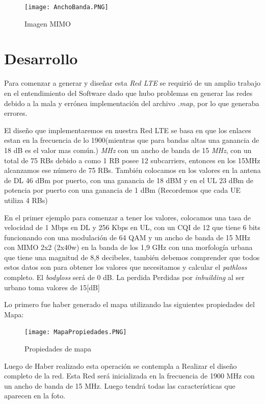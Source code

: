 \documentclass[Article, letterpaper,12pt]{article}
\begin{document}
\begin{figure}[H]
    \centering
    \texttt{[image: AnchoBanda.PNG]}
    \caption{Imagen MIMO}
    \label{fig:my_label}
\end{figure}


\section{Desarrollo}
Para comenzar a generar y diseñar esta \textit{Red LTE} se requirió de un amplio trabajo en el entendimiento del Software dado que hubo problemas en generar las redes debido a la mala y errónea implementación del archivo\textit{ .map}, por lo que generaba errores.

El diseño que implementaremos en nuestra Red LTE se basa en que los enlaces estan en la frecuencia de lo 1900(mientras que para bandas altas una ganancia de 18 dB es el valor mas común.) \textit{MHz} con un ancho de banda de 15 \textit{MHz}, con un total de 75 RBs debido a como 1 RB posee 12 subcarriers, entonces en los 15MHz alcanzamos ese número de 75 RBs.
También colocamos en los valores en la antena de DL 46 dBm por puerto, con una ganancia de 18 dBM y en el UL 23 dBm de potencia por puerto con una ganancia de 1 dBm (Recordemos que cada UE utiliza 4 RBs)


En el primer ejemplo para comenzar a tener los valores, colocamos una tasa de velocidad de 1 Mbps en DL y 256 Kbps en UL, con un CQI de 12 que tiene 6 bits funcionando con una modulación  de 64 QAM y un ancho de banda de 15 MHz con MIMO 2x2 (2x40w) en la banda de los
1,9 GHz con una morfología urbana que tiene una magnitud de 8,8 decibeles, también debemos comprender que todos estos datos son para obtener los valores que necesitamos y calcular el \textit{pathloss}  completo.
El \textit{bodyloss} será de 0 dB.
La perdida Perdidas por \textit{inbuilding} al ser urbano toma valores de 15[dB]

Lo primero fue haber generado el mapa utilizando las siguientes propiedades del Mapa:

\begin{figure}[H]
    \centering
    \texttt{[image: MapaPropiedades.PNG]}
    \caption{Propiedades de mapa}
    \label{fig:my_label}
\end{figure}

Luego de Haber realizado esta operación se contempla a Realizar el diseño completo de la red. Esta Red será inicializada en la frecuencia de 1900 MHz con un ancho de banda de 15 MHz. Luego tendrá todas las características que aparecen en la foto.
\end{document}
